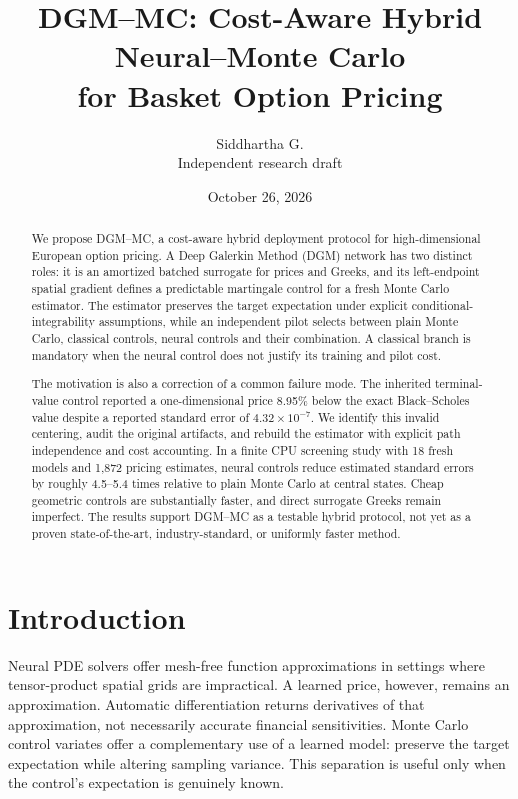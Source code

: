 \documentclass[10pt]{article}
\title{DGM--MC: Cost-Aware Hybrid Neural--Monte Carlo\\for Basket Option Pricing}
\author{Siddhartha G.\\\small Independent research draft}
\date{October 26, 2026}
\begin{document}
\maketitle

\begin{abstract}
We propose DGM--MC, a cost-aware hybrid deployment protocol for high-dimensional
European option pricing. A Deep Galerkin Method (DGM) network has two distinct
roles: it is an amortized batched surrogate for prices and Greeks, and its
left-endpoint spatial gradient defines a predictable martingale control for a
fresh Monte Carlo estimator. The estimator preserves the target expectation
under explicit conditional-integrability assumptions, while an independent pilot
selects between plain Monte Carlo, classical controls, neural controls and their
combination. A classical branch is mandatory when the neural control does not
justify its training and pilot cost.

The motivation is also a correction of a common failure mode. The inherited
terminal-value control reported a one-dimensional price 8.95\% below the exact
Black--Scholes value despite a reported standard error of
$4.32\times10^{-7}$. We identify this invalid centering, audit the original
artifacts, and rebuild the estimator with explicit path independence and cost
accounting. In a finite CPU screening study with 18 fresh models and 1,872
pricing estimates, neural controls reduce estimated standard errors by roughly
4.5--5.4 times relative to plain Monte Carlo at central states. Cheap geometric
controls are substantially faster, and direct surrogate Greeks remain imperfect.
The results support DGM--MC as a testable hybrid protocol, not yet as a proven
state-of-the-art, industry-standard, or uniformly faster method.
\end{abstract}

\section{Introduction}
Neural PDE solvers offer mesh-free function approximations in settings where
tensor-product spatial grids are impractical. A learned price, however, remains
an approximation. Automatic differentiation returns derivatives of that
approximation, not necessarily accurate financial sensitivities. Monte Carlo
control variates offer a complementary use of a learned model: preserve the
target expectation while altering sampling variance. This separation is useful
only when the control's expectation is genuinely known.
\end{document}
